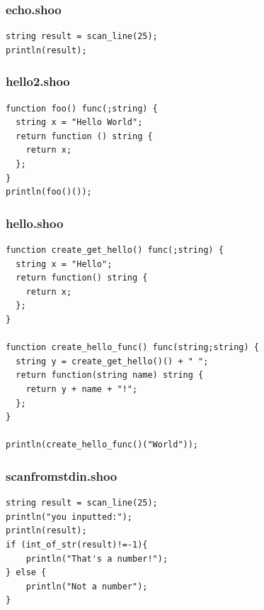 \documentclass[12pt]{article}
\begin{document}
\subsubsection{echo.shoo}
\begin{mdframed}[hidealllines=true,backgroundcolor=blue!20]
\begin{lstlisting}
string result = scan_line(25);
println(result);\end{lstlisting}
\end{mdframed}
\subsubsection{hello2.shoo}
\begin{mdframed}[hidealllines=true,backgroundcolor=blue!20]
\begin{lstlisting}
function foo() func(;string) {
  string x = "Hello World";
  return function () string {
    return x;
  };
}
println(foo()());\end{lstlisting}
\end{mdframed}
\subsubsection{hello.shoo}
\begin{mdframed}[hidealllines=true,backgroundcolor=blue!20]
\begin{lstlisting}
function create_get_hello() func(;string) {
  string x = "Hello";
  return function() string {
    return x;
  };
}

function create_hello_func() func(string;string) {
  string y = create_get_hello()() + " ";
  return function(string name) string {
    return y + name + "!";
  };
}

println(create_hello_func()("World"));\end{lstlisting}
\end{mdframed}
\subsubsection{scan\textunderscore from\textunderscore stdin.shoo}
\begin{mdframed}[hidealllines=true,backgroundcolor=blue!20]
\begin{lstlisting}
string result = scan_line(25);
println("you inputted:");
println(result);
if (int_of_str(result)!=-1){
	println("That's a number!");
} else {
	println("Not a number");
}\end{lstlisting}
\end{mdframed}
\end{document}
